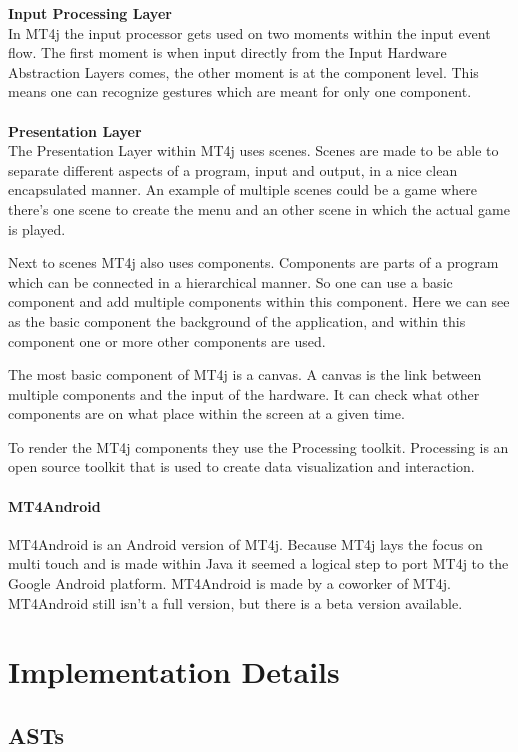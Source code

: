 \documentclass[a4paper,12pt]{report}
\begin{document}
\textbf{Input Processing Layer}
\\
In MT4j the input processor gets used on two moments within the input event flow. The first moment is when input directly from the Input Hardware Abstraction Layers comes, the other moment
is at the component level. This means one can recognize gestures which are meant for only one component.
\\
\\
\textbf{Presentation Layer}
\\
The Presentation Layer within MT4j uses scenes. Scenes are made to be able to separate different aspects of a program, input and output, in a nice clean encapsulated 
manner. An example of multiple scenes could be a game where there's one scene to create the menu and an other scene in which the actual game is played.

Next to scenes MT4j also uses components. Components are parts of a program which can be connected in a hierarchical manner. So one can use a basic component and add multiple
components within this component. Here we can see as the basic component the background of the application, and within this component one or more other components are used.

The most basic component of MT4j is a canvas. A canvas is the link between multiple components and the input of the hardware. It can check what other components are on
what place within the screen at a given time.

To render the MT4j components they use the Processing toolkit. Processing is an open source toolkit that is used to create data visualization and interaction.

\subsubsection{MT4Android}
MT4Android is an Android version of MT4j. Because MT4j lays the focus on multi touch and is made within Java it seemed a logical step to port MT4j to the Google Android 
platform. MT4Android is made by a coworker of MT4j. MT4Android still isn't a full version, but there is a beta version available.


\chapter{Implementation Details}
\section{ASTs}
\end{document}
